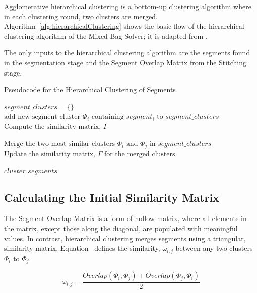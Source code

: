 Agglomerative hierarchical clustering is a bottom-up clustering algorithm where in each clustering round, two clusters are merged.  Algorithm~\ref{alg:hierarchicalClustering} shows the basic flow of the hierarchical clustering algorithm of the Mixed-Bag Solver; it is adapted from \cite{tanIntroToDataMining}.  

The only inputs to the hierarchical clustering algorithm are the segments found in the segmentation stage and the Segment Overlap Matrix from the Stitching stage.

\begin{algorithm}[tb]
\caption{Pseudocode for the Hierarchical Clustering of Segments}\label{alg:hierarchicalClustering}
\begin{algorithmic}[1]
	\State $\textit{segment\_clusters} = \{ \}$	
		\State $\text{add new segment cluster } \Phi_i \text{ containing } segment_i \text{ to } \textit{segment\_clusters}$
	\EndFor
    \State $\text{Compute the similarity matrix, } \Gamma$
\item[]
    	\State $\text{Merge the two most similar clusters } \Phi_i \text{ and } \Phi_j \text{ in } \textit{segment\_clusters}$
    	\State $\text{Update the similarity matrix, } \Gamma \text{ for the merged clusters}$
	\EndWhile
\item[]
    \State \Return $\textit{cluster\_segments}$
\EndFunction
\end{algorithmic}
\end{algorithm}

\subsection{Calculating the Initial Similarity Matrix}\label{sec:quantifyingSegmentSimilarity}

The Segment Overlap Matrix is a form of hollow matrix, where all elements in the matrix, except those along the diagonal, are populated with meaningful values.  In contrast, hierarchical clustering merges segments using a triangular, similarity matrix.  Equation~ defines the similarity, $\omega_{i,j}$ between any two clusters $\Phi_i$ to $\Phi_j$.

\begin{equation} \label{eq:segmentSimilarity}
\omega_{i,j} = \frac{Overlap(\Phi_i, \Phi_j) + Overlap(\Phi_j, \Phi_i)}{2} 
\end{equation}


